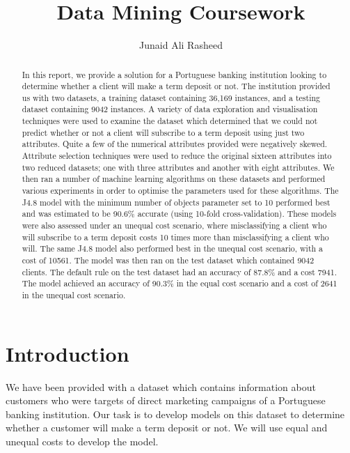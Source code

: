\documentclass[a4paper,11pt]{article}
\title{Data Mining Coursework}
\author{Junaid Ali Rasheed}
\begin{document}
\maketitle

\begin{abstract}

\noindent In this report, we provide a solution for a Portuguese banking institution looking to determine whether
a client will make a term deposit or not. The institution provided us with two datasets, a training
dataset containing 36,169 instances, and a testing dataset containing 9042 instances. A variety
of data exploration and visualisation techniques were used to examine the dataset which determined
that we could not predict whether or not a client will subscribe to a term deposit using just two
attributes. Quite a few of the numerical attributes provided were negatively skewed. Attribute
selection techniques were used to reduce the original sixteen attributes into two reduced datasets;
one with three attributes and another with eight attributes. We then ran a number of machine learning
algorithms on these datasets and performed various experiments in order to optimise the parameters used
for these algorithms. The J4.8 model with the minimum number of objects parameter set to 10 performed best
and was estimated to be 90.6\% accurate (using 10-fold cross-validation). These models were also assessed
under an unequal cost scenario, where misclassifying a client who will subscribe to a term deposit costs 10
times more than misclassifying a client who will. The same J4.8 model also performed best in the unequal
cost scenario, with a cost of 10561. The model was then ran on the test dataset which contained 9042
clients. The default rule on the test dataset had an accuracy of 87.8\% and a cost 7941. The model achieved
an accuracy of 90.3\% in the equal cost scenario and a cost of 2641 in the unequal cost scenario.

\end{abstract}

\section{Introduction}

We have been provided with a dataset which contains information about customers
who were targets of direct marketing campaigns of a Portuguese banking institution.
Our task is to develop models on this dataset to determine whether a customer
will make a term deposit or not. We will use equal and unequal costs to develop
the model.
\end{document}
